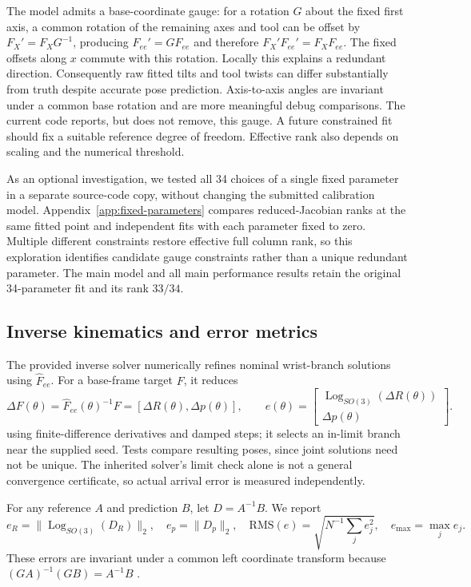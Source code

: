 \documentclass[11pt]{article}
\newcommand{\Log}{\operatorname{Log}}
\begin{document}
The model admits a base-coordinate gauge: for a rotation $G$ about the fixed first axis, a common rotation of the remaining axes and tool can be offset by $F_X'=F_XG^{-1}$, producing $F_{ee}'=GF_{ee}$ and therefore $F_X'F_{ee}'=F_XF_{ee}$. The fixed offsets along $x$ commute with this rotation. Locally this explains a redundant direction. Consequently raw fitted tilts and tool twists can differ substantially from truth despite accurate pose prediction. Axis-to-axis angles are invariant under a common base rotation and are more meaningful debug comparisons. The current code reports, but does not remove, this gauge. A future constrained fit should fix a suitable reference degree of freedom. Effective rank also depends on scaling and the numerical threshold.

As an optional investigation, we tested all 34 choices of a single fixed parameter in a separate source-code copy, without changing the submitted calibration model. Appendix~\ref{app:fixed-parameters} compares reduced-Jacobian ranks at the same fitted point and independent fits with each parameter fixed to zero. Multiple different constraints restore effective full column rank, so this exploration identifies candidate gauge constraints rather than a unique redundant parameter. The main model and all main performance results retain the original 34-parameter fit and its rank $33/34$.

\subsection{Inverse kinematics and error metrics}
The provided inverse solver numerically refines nominal wrist-branch solutions using $\widehat F_{ee}$. For a base-frame target $F$, it reduces
\begin{equation}
 \Delta F(\theta)=\widehat F_{ee}(\theta)^{-1}F
 =[\Delta R(\theta),\Delta p(\theta)],\qquad
 e(\theta)=\begin{bmatrix}\Log_{SO(3)}(\Delta R(\theta))\\\Delta p(\theta)\end{bmatrix}.
\end{equation}
using finite-difference derivatives and damped steps; it selects an in-limit branch near the supplied seed. Tests compare resulting poses, since joint solutions need not be unique. The inherited solver's limit check alone is not a general convergence certificate, so actual arrival error is measured independently.

For any reference $A$ and prediction $B$, let $D=A^{-1}B$. We report
\begin{equation}
 e_R=\|\Log_{SO(3)}(D_R)\|_2,\quad e_p=\|D_p\|_2,\quad
 \mathrm{RMS}(e)=\sqrt{N^{-1}\sum_je_j^2},\quad e_{\max}=\max_je_j.
 \label{eq:metrics}
\end{equation}
These errors are invariant under a common left coordinate transform because $(GA)^{-1}(GB)=A^{-1}B$ \cite{frames}.
\end{document}
